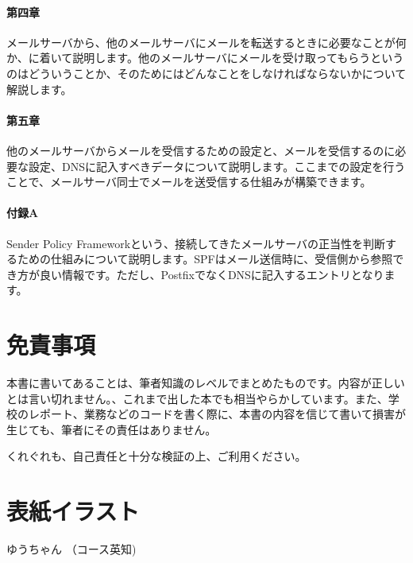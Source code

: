 \paragraph{第四章}
メールサーバから、他のメールサーバにメールを転送するときに必要なことが何か、に着いて説明します。他のメールサーバにメールを受け取ってもらうというのはどういうことか、そのためにはどんなことをしなければならないかについて解説します。

\paragraph{第五章}
他のメールサーバからメールを受信するための設定と、メールを受信するのに必要な設定、DNSに記入すべきデータについて説明します。ここまでの設定を行うことで、メールサーバ同士でメールを送受信する仕組みが構築できます。

\paragraph{付録A}
Sender Policy Frameworkという、接続してきたメールサーバの正当性を判断するための仕組みについて説明します。SPFはメール送信時に、受信側から参照でき方が良い情報です。ただし、PostfixでなくDNSに記入するエントリとなります。


\section*{免責事項}
本書に書いてあることは、筆者知識のレベルでまとめたものです。内容が正しいとは言い切れません。、これまで出した本でも相当やらかしています。また、学校のレポート、業務などのコードを書く際に、本書の内容を信じて書いて損害が生じても、筆者にその責任はありません。

くれぐれも、自己責任と十分な検証の上、ご利用ください。

\section*{表紙イラスト}
ゆうちゃん （コース英知)